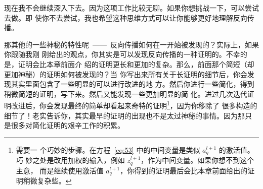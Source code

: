现在我不会继续深入下去。因为这项工作比较无聊。如果你想挑战一下，可以尝试去做。即
使你不去尝试，我也希望这种思维方式可以让你能够更好地理解反向传播。

那其他的一些神秘的特性呢~——~反向传播如何在一开始被发现的？实际上，如果你跟随我刚
刚给出的观点，你其实是可以发现反向传播的一种证明的。不幸的是，证明会比本章前面介
绍的证明更长和更加的复杂。那么，前面那个简短（却更加神秘）的证明如何被发现的？当
你写出来所有关于长证明的细节后，你会发现其实里面包含了一些明显的可以进行改进的地
方。然后你进行一些简化，得到稍微简短的证明，写下来。然后又能发现一些更加明显的简
化。进过几次迭代证明改进后，你会发现最终的简单却看起来奇特的证明\footnote{需要一
  个巧妙的步骤。在方程~\eqref{eq:53} 中的中间变量是类似 $a_q^{l+1}$ 的激活值。巧
  妙之处是改用加权的输入，例如 $z^{l+1}_q$，作为中间变量。如果你想不到这个主意，
  而是继续使用激活值
  $a_q^{l+1}$，你得到的证明最后会比本章前面给出的证明稍微复杂些。}，因为你移除了
很多构造的细节了！老实告诉你，其实最早的证明的出现也不是太过神秘的事情。因为那只
是很多对简化证明的艰辛工作的积累。
